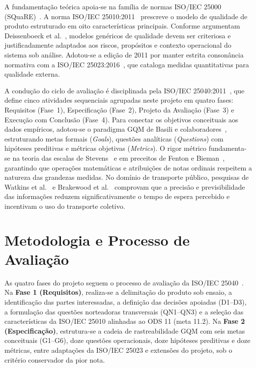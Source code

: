 \documentclass[11pt,a4paper]{article}
\begin{document}
A fundamentação teórica apoia-se na família de normas ISO/IEC 25000 (SQuaRE)~\cite{iso25000}. A norma ISO/IEC 25010:2011~\cite{iso25010} prescreve o modelo de qualidade de produto estruturado em oito características principais. Conforme argumentam Deissenboeck et al.~\cite{deissenboeck2009}, modelos genéricos de qualidade devem ser criteriosa e justificadamente adaptados aos riscos, propósitos e contexto operacional do sistema sob análise. Adotou-se a edição de 2011 por manter estrita consonância normativa com a ISO/IEC 25023:2016~\cite{iso25023}, que cataloga medidas quantitativas para qualidade externa.

A condução do ciclo de avaliação é disciplinada pela ISO/IEC 25040:2011~\cite{iso25040}, que define cinco atividades sequenciais agrupadas neste projeto em quatro fases: Requisitos (Fase~1), Especificação (Fase~2), Projeto da Avaliação (Fase~3) e Execução com Conclusão (Fase~4). Para conectar os objetivos conceituais aos dados empíricos, adotou-se o paradigma GQM de Basili e colaboradores~\cite{basili1988,basili1994}, estruturando metas formais (\textit{Goals}), questões analíticas (\textit{Questions}) com hipóteses preditivas e métricas objetivas (\textit{Metrics}). O rigor métrico fundamenta-se na teoria das escalas de Stevens~\cite{stevens1946} e em preceitos de Fenton e Bieman~\cite{fenton2014}, garantindo que operações matemáticas e atribuições de notas ordinais respeitem a natureza das grandezas medidas. No domínio de transporte público, pesquisas de Watkins et al.~\cite{watkins2011} e Brakewood et al.~\cite{brakewood2015} comprovam que a precisão e previsibilidade das informações reduzem significativamente o tempo de espera percebido e incentivam o uso do transporte coletivo.

\section{Metodologia e Processo de Avaliação}
\label{sec:metodologia}

As quatro fases do projeto seguem o processo de avaliação da ISO/IEC 25040~\cite{iso25040}. Na \textbf{Fase 1 (Requisitos)}, realiza-se a delimitação do produto sob ensaio, a identificação das partes interessadas, a definição das decisões apoiadas (D1--D3), a formulação das questões norteadoras transversais (QN1--QN3) e a seleção das características da ISO/IEC 25010 alinhadas ao ODS 11 (meta 11.2). Na \textbf{Fase 2 (Especificação)}, estrutura-se a cadeia de rastreabilidade GQM com seis metas conceituais (G1--G6), doze questões operacionais, doze hipóteses preditivas e doze métricas, entre adaptações da ISO/IEC 25023 e extensões do projeto, sob o critério conservador da pior nota.
\end{document}
